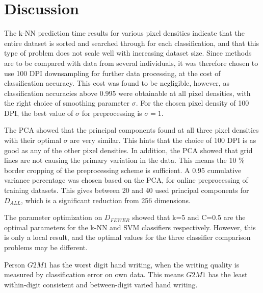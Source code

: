 \section{Discussion}
\label{sec:discussion}
The k-NN prediction time results for various pixel densities
indicate that the entire dataset is sorted and searched through for
each classification,
and that this type of problem does not scale well with increasing
dataset size.
Since methods are to be compared with data from several individuals,
it was therefore chosen to use 100 DPI downsampling for further data processing,
at the cost of classification accuracy.
%
This cost was found to be negligible, however,
as classification accuracies above 0.995 were obtainable
at all pixel densities, with the right choice of smoothing
parameter \(\sigma\).
For the chosen pixel density of 100 DPI, the best value of \(\sigma\)
for preprocessing is \(\sigma=1\).

The PCA showed that the principal components
found at all three pixel densities with their optimal \(\sigma\)
are very similar.
This hints that the choice of 100 DPI is
as good as any of the other pixel densities.
In addition, the PCA showed that grid lines
are not causing the primary variation in the data.
This means the 10 \% border cropping of the preprocessing scheme
is sufficient.
A 0.95 cumulative variance percentage was chosen based
on the PCA, for online preprocessing of training datasets.
This gives between 20 and 40 used principal components
for \(D_{ALL}\), which is a significant reduction from 256 dimensions.

The parameter optimization on \(D_{FEWER}\) showed
that k=5 and C=0.5 are the optimal parameters for the
k-NN and SVM classifiers respectively.
However, this is only a local result,
and the optimal values for the three classifier comparison
problems may be different.

Person \(G2M1\) has the worst digit hand writing,
when the writing quality is measured by classification
error on own data. This means \(G2M1\) has the least
within-digit consistent and between-digit varied
hand writing.

